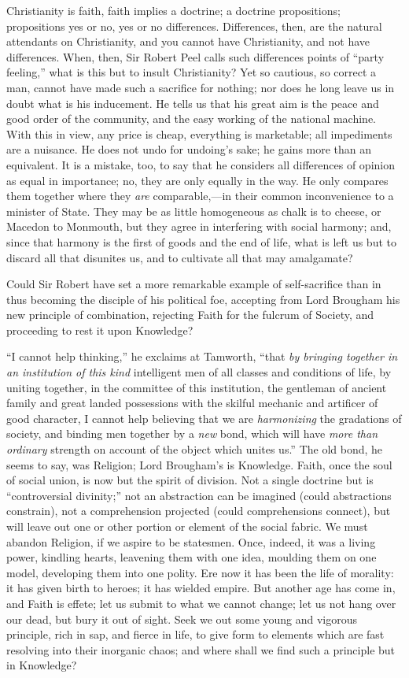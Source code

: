 Christianity is faith, faith implies a doctrine; a doctrine
propositions; propositions yes or no, yes or no differences.
Differences, then, are the natural attendants on Christianity, and you
cannot have Christianity, and not have differences. When, then, Sir
Robert Peel calls such differences points of ``party
feeling,'' what is this but to insult Christianity? Yet so
cautious, so correct a man, cannot have made such a sacrifice for
nothing; nor does he long leave us in doubt what is his inducement. He
tells us that his great aim is the peace and good order of the
community, and the easy working of the national machine. With this in
view, any price is cheap, everything is marketable; all impediments
are a nuisance. He does not undo for undoing's sake; he gains more
than an equivalent. It is a mistake, too, to say that he considers all
differences of opinion as equal in importance; no, they are only
equally in the way. He only compares them together where they \emph{are}
comparable,—in their common inconvenience to a minister of State.
They may be as little homogeneous as chalk is to cheese, or Macedon to
Monmouth, but they agree in interfering with social harmony; and,
since that harmony is the first of goods and the end of life, what is
left us but to discard all that disunites us, and to cultivate all
that may amalgamate?

Could Sir Robert have set a more remarkable example of
self-sacrifice than in thus becoming the disciple of his political
foe, accepting from Lord Brougham his new principle of combination,
rejecting Faith for the fulcrum of Society, and proceeding to rest it
upon Knowledge?

``I cannot help thinking,'' he exclaims at Tamworth,
``that \emph{by bringing together in an institution of this kind}
intelligent men of all classes and conditions of life, by uniting
together, in the committee of this institution, the gentleman of
ancient family and great landed possessions with the skilful mechanic
and artificer of good character, I cannot help believing that we are \emph{harmonizing}
the gradations of society, and binding men together by a \emph{new}
bond, which will have \emph{more than ordinary} strength on account of
the object which unites us.'' The old bond, he seems to say, was
Religion; Lord Brougham's is Knowledge. Faith, once the soul of social
union, is now but the spirit of division. Not a single doctrine but is
``controversial divinity;'' not an abstraction can be imagined
(could abstractions constrain), not a comprehension projected (could
comprehensions connect), but will leave out one or other portion or
element of the social fabric. We must abandon Religion, if we aspire
to be statesmen. Once, indeed, it was a living power, kindling hearts,
leavening them with one idea, moulding them on one model,
developing them into one polity. Ere now it has been the life of
morality: it has given birth to heroes; it has wielded empire. But
another age has come in, and Faith is effete; let us submit to what we
cannot change; let us not hang over our dead, but bury it out of
sight. Seek we out some young and vigorous principle, rich in sap, and
fierce in life, to give form to elements which are fast resolving into
their inorganic chaos; and where shall we find such a principle but in
Knowledge?

